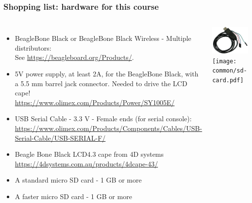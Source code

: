 \begin{frame}
\frametitle{Shopping list: hardware for this course}
  \begin{columns}
    \begin{itemize}
      \item BeagleBone Black or BeagleBone Black Wireless - Multiple distributors: \\
	    See \url{https://beagleboard.org/Products/}.
      \item 5V power supply, at least 2A, for the BeagleBone Black, with a 5.5 mm barrel
            jack connector. Needed to drive the LCD cape!\\
	    \url{https://www.olimex.com/Products/Power/SY1005E/}
      \item USB Serial Cable - 3.3 V - Female ends (for serial console): \\
	    \url{https://www.olimex.com/Products/Components/Cables/USB-Serial-Cable/USB-SERIAL-F/}
      \item Beagle Bone Black LCD4.3 cape from 4D systems\\
            \url{https://4dsystems.com.au/products/4dcape-43/}
      \item A standard micro SD card - 1 GB or more
      \item A faster micro SD card - 1 GB or more
    \end{itemize}
    \includegraphics[height=0.20\textheight]{common/usb-serial-cable-female.png} \\
    \texttt{[image: common/sd-card.pdf]} \\
  \end{columns}
\end{frame}
